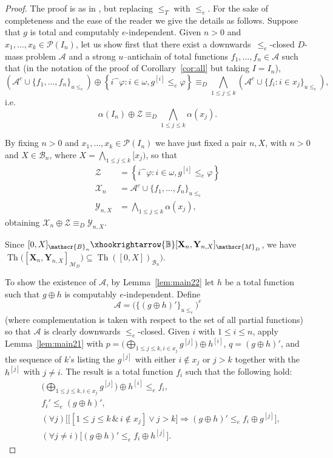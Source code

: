 \documentclass[11pt]{amsart}
\renewcommand{\phi}{\varphi}
\newcommand{\aaa}{\mathcal{A}}
\newcommand{\Th}{\operatorname{Th}}
\newcommand{\cat}[2]{#1\widehat{\phantom{\alpha}}\!#2}
\newcommand{\MP}[1]{\ensuremath{\mathcal{#1}}}
\begin{document}
\begin{proof}
The proof is as in \cite[Theorem~1.1]{Kuyper-Medvedev}, but replacing $\le_T$ 
with $\le_e$. For the sake of completeness and the ease of the reader we give 
the details as follows. Suppose that $g$ is total and computably 
$e$-independent. Given $n >0 $ and $x_1, \ldots, x_k \in \mathscr{P}(I_n)$, 
let us show first that there exist a downwards~$\le_e$-closed $D$-mass 
problem $\mathcal{A}$ and a strong $u$--antichain of total functions $f_1, 
\ldots, f_n \in \mathcal{A}$ such that (in the notation of the proof of 
Corollary~\ref{cor:all} but taking $I=I_n$), 
\begin{equation}\label{eq:main}
\left(\aaa^c \cup \{f_1, \ldots, f_n\}_{u\le_e} \right)
                 \oplus  \left\{\cat{i}{\phi}:
i \in \omega, g^{[i]}\le_e \phi\right\}\equiv_D \bigwedge_{1 \le j \le k}
\left(\aaa^c \cup \{f_i: i\in x_j\}_{u\le_e} \right),
\end{equation}
i.e. 
\[
\alpha(I_n) \oplus \mathcal{Z}\equiv_D \bigwedge_{1 \le j \le k}\alpha(x_j). 
\]

By fixing $n>0$ and $x_1, \ldots, x_k \in \mathscr{P}(I_n)$ we have just 
fixed a pair $n, X$, with $n>0$ and $X \in \mathscr{B}_n$, where 
$X=\bigwedge_{1 \le j \le k} [x_j)$, so that 
\begin{align*}
\mathcal{Z}&=\left\{\cat{i}{\phi}: i \in \omega, g^{[i]}\le_e \phi\right\}\\
\mathcal{X}_{n} &=\aaa^c \cup \{f_1, \ldots, f_n\}_{u\le_e}\\
\mathcal{Y}_{n,X} &= \bigwedge_{1 \le j \le k}\alpha(x_j),
\end{align*}
obtaining $\mathcal{X}_{n} \oplus \mathcal{Z}\equiv_D \mathcal{Y}_{n,X}$. 

Since $[0, X]_{\mathscr{B}_n} \xhookrightarrow{\mathbb{B}} [\mathbf{X}_{n}, 
\mathbf{Y}_{n,X}]_{\mathscr{M}_D}$, we have $\Th\big([\mathbf{X}_{n}, 
\mathbf{Y}_{n,X}]_{\mathscr{M}_D}\big) \subseteq \Th([0, 
X])_{\mathscr{B}_n})$. 

To show the existence of $\MP{A}$, by Lemma~\ref{lem:main22} let $h$ be a
total function such that $g \oplus h$ is computably $e$-independent. Define
\[
\aaa=\big(\{(g \oplus h)'\}_{u\le_e}\big)^c
\]
(where complementation is taken with respect to the set of all partial 
functions) so that $\aaa$ is clearly downwards $\le_e$-closed. Given $i$ with 
$1 \le i \le n$, apply Lemma~\ref{lem:main21} with $p = \Big(\bigoplus_{1\le 
j \le k, i \in x_j} g^{[j]}\Big) \oplus h^{[i]}$, $q = (g\oplus h)'$, and the 
sequence of $k$'s listing the $g^{[j]}$ with either $i \notin x_j$ or $j > k$ 
together with the $h^{[j]}$ with $j \neq i$.  The result is a total function 
$f_i$ such that the following hold: 
\begin{align*}
&\Big( \bigoplus_{1\le j \le k, i \in x_j} g^{[j]}\Big) \oplus h^{[i]} \le_e 
    f_i,\\
& f_i' \le_e (g\oplus h)',\\
&(\forall j)\Big[ \big[ [1 \le j \le k \,\&\, i \notin 
    x_j] \lor j >k \big] \Rightarrow (g \oplus h)' \le_e f_i 
\oplus g^{[j]}\Big],\\ 
&(\forall j \ne i)\big[(g \oplus h)' \le_e f_i \oplus h^{[j]}\big]. 
\end{align*}


\end{proof}
\end{document}
